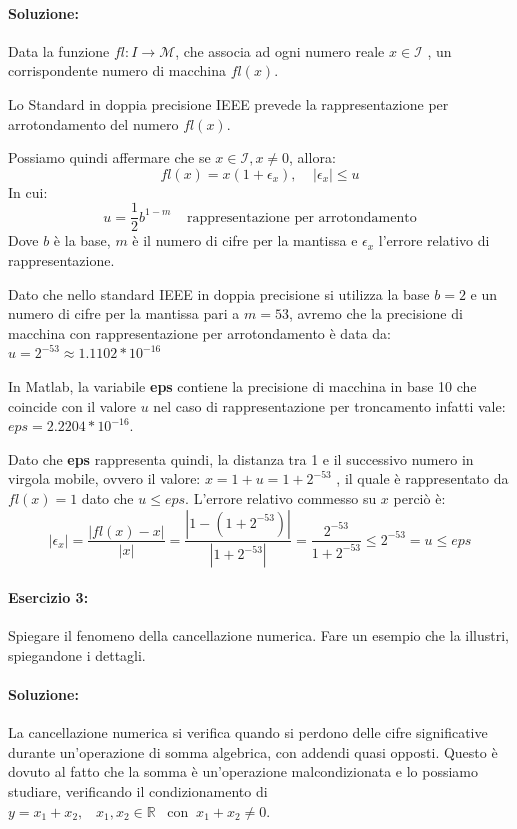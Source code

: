 \documentclass[12pt]{article}
\begin{document}
\paragraph{Soluzione:}
Data la funzione \(fl: I \longrightarrow \mathcal{M}\), che associa ad ogni numero reale \(x \in \mathcal{I}\)
, un corrispondente numero di macchina \(fl(x)\). 

Lo Standard in doppia precisione IEEE prevede la rappresentazione per arrotondamento del numero \(fl(x)\).

Possiamo quindi affermare che se \(x \in \mathcal{I}, x\neq 0\), allora:
$$ fl(x)=x(1+\epsilon_x), \;\;\;\; |\epsilon_x|\leq u$$
In cui:
$$ u = \frac{1}{2}b^{1-m}\;\;\;\; \text{rappresentazione per arrotondamento}$$   
Dove \(b\) è la base, \(m\) è il numero di cifre per la mantissa e \(\epsilon_x\) l'errore relativo di rappresentazione.

Dato che nello standard IEEE in doppia precisione si utilizza la base \(b=2\) e un numero di cifre per la mantissa pari a \(m=53\), avremo che la 
precisione di macchina con rappresentazione per arrotondamento è data da: \(u=2^{-53}\approx 1.1102* 10^{-16}\)

In Matlab, la variabile \textbf{eps} contiene la precisione di macchina in base 10 che coincide con il valore \(u\) nel caso di rappresentazione per troncamento
infatti vale: \(eps=2.2204*10^{-16}\). 

Dato che \textbf{eps} rappresenta quindi, la distanza tra 1 e il successivo numero in virgola mobile, ovvero il valore: \(x=1+u=1+2^{-53}\)
, il quale è rappresentato da \(fl(x)=1\) dato che \(u\leq eps\). 
L'errore relativo commesso su \(x\) perciò è:
$$ |\epsilon_x| =\frac{|fl(x)-x|}{|x|}=\frac{|1-(1+2^{-53})|}{|1+2^{-53}|}=\frac{2^{-53}}{1+2^{-53}} \le 2^{-53}=u \le eps$$

\paragraph{Esercizio 3:} Spiegare il fenomeno della cancellazione numerica. Fare un esempio che la illustri, spiegandone i dettagli.

\paragraph{Soluzione:}
La cancellazione numerica si verifica quando si perdono delle cifre significative durante un'operazione di somma algebrica, con addendi quasi opposti.
Questo è dovuto al fatto che la somma è un'operazione malcondizionata e lo possiamo studiare, verificando il condizionamento di \(y=x_1+x_2,\;\;\; x_1,x_2 \in \mathbb{R} \;\;\;\text{con}\;\; x_1+x_2\neq 0\).
\end{document}
